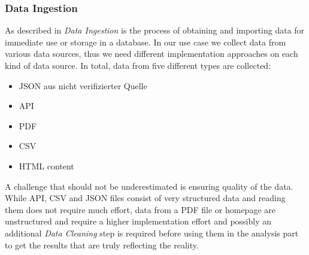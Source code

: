 \subsubsection{Data Ingestion}
\label{subsubsec:ingestion}
As described in \cite{ingestion} \textit{Data Ingestion} is the process of obtaining and importing data for immediate use or storage in a database. In our use case we collect data from various data sources, thus we need different implementation approaches on each kind of data source. \newline
In total, data from five different types are collected:
\begin{itemize}
  \item \ac{JSON} aus nicht verifizierter Quelle
  \item \ac{API}
  \item \acs{PDF}
  \item \ac{CSV}
  \item \acs{HTML} content
\end{itemize}
A challenge that should not be underestimated is ensuring quality of the data.
While \ac{API}, \ac{CSV} and \ac{JSON} files consist of very structured data and reading them does not require much effort,
data from a \ac{PDF} file or homepage are unstructured and require a higher implementation effort and possibly an additional
\textit{Data Cleaning} step is required before using them in the analysis part to get the results that are truly reflecting the reality.
%
